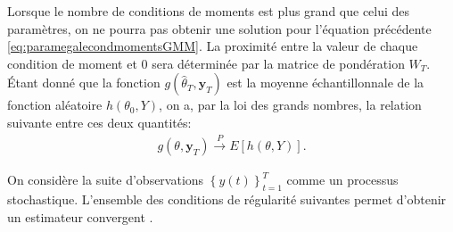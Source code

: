 Lorsque le nombre de conditions de moments est plus grand que celui
des paramètres, on ne pourra pas obtenir une solution pour l'équation
précédente \eqref{eq:paramegalecondmomentsGMM}. La proximité entre la
valeur de chaque condition de moment et $0$ sera déterminée par la
matrice de pondération $W_T$. Étant donné que la fonction
$g(\hat\theta_T,\mathbf{y}_{T})$ est la moyenne échantillonnale de la
fonction aléatoire $h\left(\theta_0,Y \right)$, on a, par la loi des
grands nombres, la relation suivante entre ces deux quantités:
\begin{align}
  g(\theta,\mathbf{y}_{T}) \stackrel{P}{\longrightarrow} E
  \left[h\left(\theta,Y \right) \right]. \label{eq:normequadratique}
\end{align}

On considère la suite d'observations $\left\{y(t) \right\}_{t=1}^T$
comme un processus stochastique. L'ensemble des conditions de
régularité suivantes permet d'obtenir un estimateur convergent
\citep{hansen1982large}.
